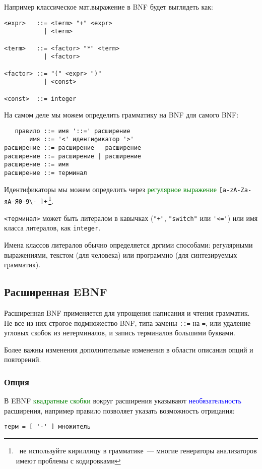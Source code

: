 \documentclass[oneside,10pt]{article}
\renewcommand{\emph}[1]{\textcolor{blue}{#1}}
\newcommand{\note}[1]{\,\footnote{\ #1}}
\newcommand{\term}[1]{\textcolor{green}{#1}}
\begin{document}
Например классическое мат.выражение в BNF будет выглядеть как:
\begin{verbatim}
<expr>   ::= <term> "+" <expr>
           | <term>

<term>   ::= <factor> "*" <term>
           | <factor>

<factor> ::= "(" <expr> ")"
           | <const>

<const>  ::= integer
\end{verbatim}

\pagebreak
На самом деле мы можем определить грамматику на BNF для самого BNF:
\begin{verbatim}
   правило ::= имя '::=' расширение
       имя ::= '<' идентификатор '>'
расширение ::= расширение   расширение
расширение ::= расширение | расширение
расширение ::= имя
расширение ::= терминал
\end{verbatim}

Идентификаторы мы можем определить через \term{регулярное выражение}
\verb|[a-zA-Zа-яА-Я0-9\-_]+|\note{не используйте кириллицу в грамматике\ ---
многие генераторы анализаторов имеют проблемы с кодировками}.

\verb|<терминал>| может быть литералом в кавычках (\verb|"+"|, \verb|"switch"|
или \verb|'<='|) или имя класса литералов, как \verb|integer|.

Имена классов литералов обычно определяется дргими способами: регулярными
выражениями, текстом (для человека) или программно (для синтезируемых
грамматик).

\subsection{Расширенная EBNF}

Расширенная BNF применяется для упрощения написания и чтения грамматик. Не все
из них строгое подмножество BNF, типа замены \verb|::=| на \verb|=|, или
удаление угловых скобок из нетерминалов, и запись терминалов большими буквами.

Более важны изменения дополнительные изменения в области описания опций и
повторений.

\subsubsection{Опция}

В EBNF \term{квадратные скобки} вокруг расширения указывают
\emph{необязательность} расширения, например правило позволяет указать
возможность отрицания:
\begin{verbatim}
терм = [ '-' ] множитель 
\end{verbatim}
\end{document}

